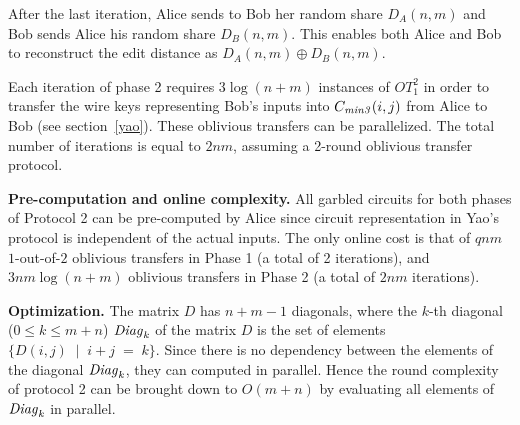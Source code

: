 After the last iteration, Alice sends to Bob her random share $D_A(n,m)$
and Bob sends Alice his random share $D_B(n,m)$.  This enables both
Alice and Bob to reconstruct the edit distance as $D_A(n,m) \oplus D_B(n,m)$.

Each iteration of phase 2 requires $3 \log(n+m)$ instances of $OT_1^2$ in
order to transfer the wire keys representing Bob's inputs into $C_{\mathit{min3}}(i,j)$
from Alice to Bob (see section~\ref{yao}).  These oblivious transfers
can be parallelized.  The total number of iterations is equal
to $2nm$, assuming a 2-round oblivious transfer protocol.

\vspace{1ex}
\noindent
\textbf{Pre-computation and online complexity.}
All garbled circuits for both phases of Protocol 2 can be pre-computed
by Alice since circuit representation in Yao's protocol is independent of
the actual inputs.  The only online cost is that of $qnm$ $1$-out-of-$2$
oblivious transfers in Phase 1 (a total of 2 iterations),
and $3nm\log(n+m)$ oblivious transfers in Phase 2 (a total of $2nm$
iterations).

\vspace{1ex}
\noindent
\textbf{Optimization.} The matrix $D$ has $n+m-1$ diagonals, where 
the $k$-th diagonal ($0 \leq k \leq m+n$) ${\it Diag}_k$ of the matrix $D$ is 
the set of elements $\{ D(i,j) \; \mid \; i+j \; = \; k \}$. Since there
is no dependency between the elements of the diagonal ${\it Diag}_k$, they can 
computed in parallel. Hence the round complexity of protocol 2 can be brought
down to  $O(m+n)$ by evaluating all elements of ${\it Diag}_k$ in parallel.




